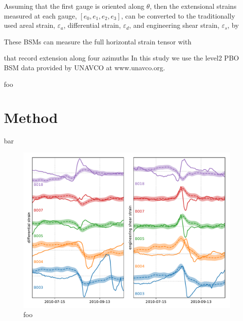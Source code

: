 \documentclass[10pt,a4paper]{article}
\begin{document}
Assuming that the first gauge is oriented along $\theta$, then the extensional strains measured at each gauge, $[e_0,e_1,e_2,e_3]$, can be converted to the traditionally used areal strain, $\varepsilon_a$, differential strain, $\varepsilon_d$, and engineering shear strain, $\varepsilon_s$, by



These BSMs can measure the full horizontal strain tensor with    

that record extension along four azimuths  
In this study we use the level2 PBO BSM data provided by UNAVCO at www.unavco.org.     


foo \citet{Hines2017}

\section{Method}\label{sec:Method}
bar
\begin{figure}
\includegraphics[scale=0.8]{figures/Figure_1}
\caption{foo}   
\label{fig:Demo1}
\end{figure}


  
 
\end{document}
